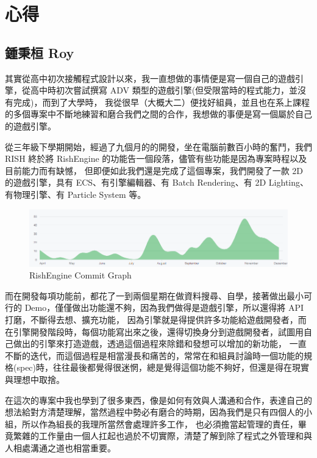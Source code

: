 \chapter{心得}

\section{鍾秉桓 Roy}
\label{sec:Roy}

其實從高中初次接觸程式設計以來，我一直想做的事情便是寫一個自己的遊戲引擎，從高中時初次嘗試撰寫 ADV 類型的遊戲引擎(但受限當時的程式能力，並沒有完成)，而到了大學時，
我從很早（大概大二）便找好組員，並且也在系上課程的多個專案中不斷地練習和磨合我們之間的合作，我想做的事便是寫一個屬於自己的遊戲引擎。

從三年級下學期開始，經過了九個月的的開發，坐在電腦前數百小時的奮鬥，我們 RISH 終於將 RishEngine 的功能告一個段落，儘管有些功能是因為專案時程以及目前能力而有缺憾，
但即便如此我們還是完成了這個專案，我們開發了一款 2D 的遊戲引擎，具有 ECS、有引擎編輯器、有 Batch Rendering、有 2D Lighting、有物理引擎、有 Particle System 等。

\begin{figure}[h]
    \begin{center}
    \includegraphics[width=\textwidth]{./resources/ch6/commit.png}
    \end{center}
\caption{RishEngine Commit Graph}
\label{fig:RishEngineCommits}
\end{figure}

而在開發每項功能前，都花了一到兩個星期在做資料搜尋、自學，接著做出最小可行的 Demo，僅僅做出功能還不夠，因為我們做得是遊戲引擎，所以還得將 API 打磨，不斷得去想、擴充功能，
因為引擎就是得提供許多功能給遊戲開發者，而在引擎開發階段時，每個功能寫出來之後，還得切換身分到遊戲開發者，試圖用自己做出的引擎來打造遊戲，透過這個過程來除錯和發想可以增加的新功能，
一直不斷的迭代，而這個過程是相當漫長和痛苦的，常常在和組員討論時一個功能的規格(spec)時，往往最後都覺得很迷惘，總是覺得這個功能不夠好，但還是得在現實與理想中取捨。

在這次的專案中我也學到了很多東西，像是如何有效與人溝通和合作，表達自己的想法給對方清楚理解，當然過程中勢必有磨合的時期，因為我們是只有四個人的小組，所以作為組長的我理所當然會處理許多工作，
也必須擔當起管理的責任，畢竟繁雜的工作量由一個人扛起也過於不切實際，清楚了解到除了程式之外管理和與人相處溝通之道也相當重要。

